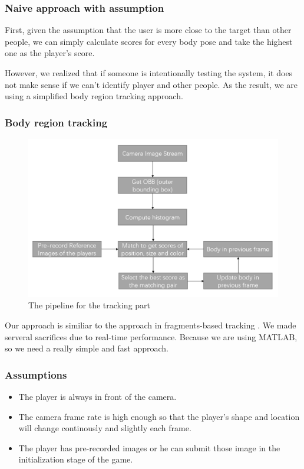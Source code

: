 \documentclass[11pt,twocolumn,letterpaper]{article}
\begin{document}
\subsubsection {Naive approach with assumption}
\par
First, given the assumption that the user is more close to the target than other people, we can simply calculate scores for every body pose and take the highest one as the player's score.
\par
However, we realized that if someone is intentionally testing the system, it does not make sense if we can't identify player and other people. As the result, we are using a simplified body region tracking approach.
\subsubsection{Body region tracking}
      \begin{figure}[h]
      \centering
      \includegraphics[width=\linewidth]{./Pic/tracking-pipeline.png}
      \caption{The pipeline for the tracking part}
      \end{figure}
\par
Our approach is similiar to the approach in fragments-based tracking  \cite{1640835}. We made serveral sacrifices due to real-time performance. Because  we are using MATLAB, so we need a really simple and fast approach. 
\par
\subsubsection*{Assumptions}
\begin{itemize}
\item The player is always in front of the camera.
\item The camera frame rate is high enough so that the player's shape and location will change continously and slightly each frame.
\item The player has pre-recorded images or he can submit those image in the initialization stage of the game.
\end{itemize}
\end{document}
